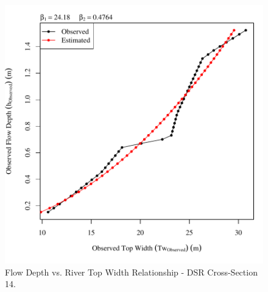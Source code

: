 \begin{center}
\begin{figure}[htbp]
	\includegraphics[width=6in]{"Figures/Results_DSR/Survey Tw vs H-Section 14"}
	\caption{Flow Depth vs. River Top Width Relationship - DSR Cross-Section 14.}
\end{figure}
\end{center}
\newpage